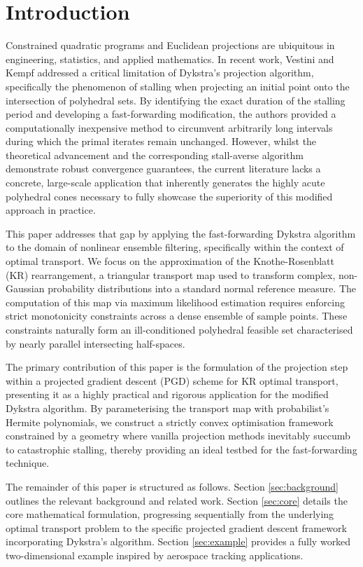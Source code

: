 \section{Introduction}

Constrained quadratic programs and Euclidean projections are ubiquitous in engineering, statistics, and applied mathematics. In recent work, Vestini and Kempf \cite{Vestini2025} addressed a critical limitation of Dykstra's projection algorithm, specifically the phenomenon of stalling when projecting an initial point onto the intersection of polyhedral sets. By identifying the exact duration of the stalling period and developing a fast-forwarding modification, the authors provided a computationally inexpensive method to circumvent arbitrarily long intervals during which the primal iterates remain unchanged. However, whilst the theoretical advancement and the corresponding stall-averse algorithm demonstrate robust convergence guarantees, the current literature lacks a concrete, large-scale application that inherently generates the highly acute polyhedral cones necessary to fully showcase the superiority of this modified approach in practice. 

This paper addresses that gap by applying the fast-forwarding Dykstra algorithm to the domain of nonlinear ensemble filtering, specifically within the context of optimal transport. We focus on the approximation of the Knothe-Rosenblatt (KR) rearrangement, a triangular transport map used to transform complex, non-Gaussian probability distributions into a standard normal reference measure. The computation of this map via maximum likelihood estimation requires enforcing strict monotonicity constraints across a dense ensemble of sample points. These constraints naturally form an ill-conditioned polyhedral feasible set characterised by nearly parallel intersecting half-spaces.

The primary contribution of this paper is the formulation of the projection step within a projected gradient descent (PGD) scheme for KR optimal transport, presenting it as a highly practical and rigorous application for the modified Dykstra algorithm. By parameterising the transport map with probabilist's Hermite polynomials, we construct a strictly convex optimisation framework constrained by a geometry where vanilla projection methods inevitably succumb to catastrophic stalling, thereby providing an ideal testbed for the fast-forwarding technique.

The remainder of this paper is structured as follows. Section \ref{sec:background} outlines the relevant background and related work. Section \ref{sec:core} details the core mathematical formulation, progressing sequentially from the underlying optimal transport problem to the specific projected gradient descent framework incorporating Dykstra's algorithm. Section \ref{sec:example} provides a fully worked two-dimensional example inspired by aerospace tracking applications.